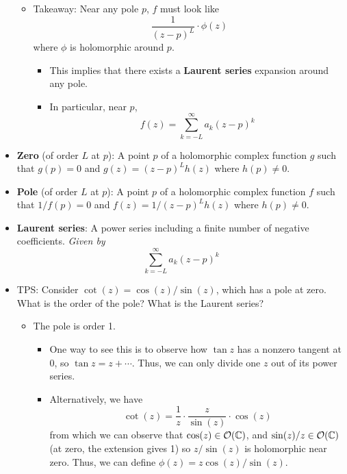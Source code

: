 \documentclass[../notes.tex]{subfiles}
\begin{document}
\begin{itemize}
\begin{itemize}
        \item Takeaway: Near any pole $p$, $f$ must look like
        \begin{equation*}
            \frac{1}{(z-p)^L}\cdot\phi(z)
        \end{equation*}
        where $\phi$ is holomorphic around $p$.
        \begin{itemize}
            \item This implies that there exists a \textbf{Laurent series} expansion around any pole.
            \item In particular, near $p$,
            \begin{equation*}
                f(z) = \sum_{k=-L}^\infty a_k(z-p)^k
            \end{equation*}
        \end{itemize}
    \end{itemize}
    \item \textbf{Zero} (of order $L$ at $p$): A point $p$ of a holomorphic complex function $g$ such that $g(p)=0$ and $g(z)=(z-p)^Lh(z)$ where $h(p)\neq 0$.
    \item \textbf{Pole} (of order $L$ at $p$): A point $p$ of a holomorphic complex function $f$ such that $1/f(p)=0$ and $f(z)=1/(z-p)^Lh(z)$ where $h(p)\neq 0$.
    \item \textbf{Laurent series}: A power series including a finite number of negative coefficients. \emph{Given by}
    \begin{equation*}
        \sum_{k=-L}^\infty a_k(z-p)^k
    \end{equation*}
    \item TPS: Consider $\cot(z)=\cos(z)/\sin(z)$, which has a pole at zero. What is the order of the pole? What is the Laurent series?
    \begin{itemize}
        \item The pole is order 1.
        \begin{itemize}
            \item One way to see this is to observe how $\tan z$ has a nonzero tangent at 0, so $\tan z=z+\cdots$. Thus, we can only divide one $z$ out of its power series.
            \item Alternatively, we have
            \begin{equation*}
                \cot(z) = \frac{1}{z}\cdot\frac{z}{\sin(z)}\cdot\cos(z)
            \end{equation*}
            from which we can observe that $\cos(z)\in\mathcal{O}(\mathbb{C})$, and $\sin(z)/z\in\mathcal{O}(\mathbb{C})$ (at zero, the extension gives 1) so $z/\sin(z)$ is holomorphic near zero. Thus, we can define $\phi(z)=z\cos(z)/\sin(z)$.

\end{itemize}
\end{itemize}
\end{itemize}
\end{document}
